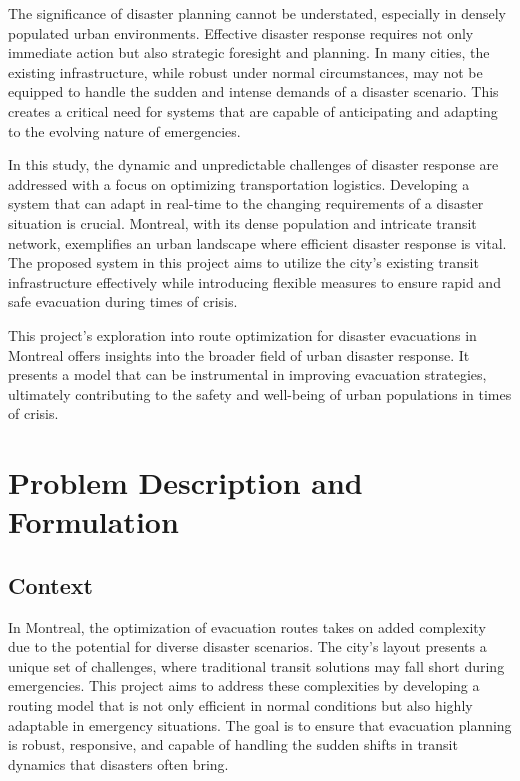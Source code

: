 \documentclass[12pt]{article}
\begin{document}
The significance of disaster planning cannot be understated, especially in densely populated urban environments. Effective disaster response requires not only immediate action but also strategic foresight and planning. In many cities, the existing infrastructure, while robust under normal circumstances, may not be equipped to handle the sudden and intense demands of a disaster scenario. This creates a critical need for systems that are capable of anticipating and adapting to the evolving nature of emergencies.

In this study, the dynamic and unpredictable challenges of disaster response are addressed with a focus on optimizing transportation logistics. Developing a system that can adapt in real-time to the changing requirements of a disaster situation is crucial. Montreal, with its dense population and intricate transit network, exemplifies an urban landscape where efficient disaster response is vital. The proposed system in this project aims to utilize the city's existing transit infrastructure effectively while introducing flexible measures to ensure rapid and safe evacuation during times of crisis.

This project's exploration into route optimization for disaster evacuations in Montreal offers insights into the broader field of urban disaster response. It presents a model that can be instrumental in improving evacuation strategies, ultimately contributing to the safety and well-being of urban populations in times of crisis.

\section{Problem Description and Formulation}

\subsection{Context}

In Montreal, the optimization of evacuation routes takes on added complexity due to the potential for diverse disaster scenarios. The city's layout presents a unique set of challenges, where traditional transit solutions may fall short during emergencies. This project aims to address these complexities by developing a routing model that is not only efficient in normal conditions but also highly adaptable in emergency situations. The goal is to ensure that evacuation planning is robust, responsive, and capable of handling the sudden shifts in transit dynamics that disasters often bring.
\end{document}
